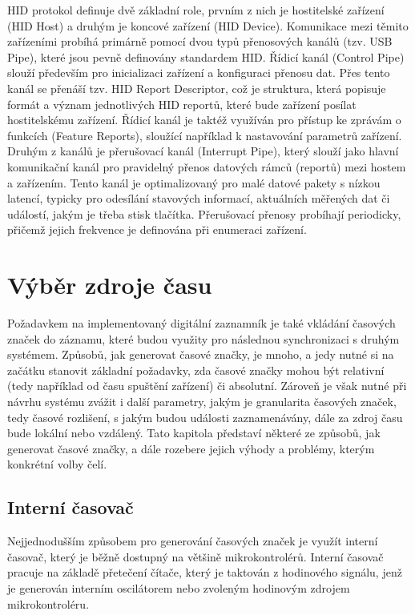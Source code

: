 HID protokol definuje dvě základní role, prvním z nich je hostitelské zařízení (HID Host) a druhým je koncové zařízení (HID Device). Komunikace mezi těmito zařízeními probíhá primárně pomocí dvou typů přenosových kanálů (tzv. USB Pipe), které jsou pevně definovány standardem HID. Řídicí kanál (Control Pipe) slouží především pro inicializaci zařízení a konfiguraci přenosu dat. Přes tento kanál se přenáší tzv. HID Report Descriptor, což je struktura, která popisuje formát a význam jednotlivých HID reportů, které bude zařízení posílat hostitelskému zařízení. Řídicí kanál je taktéž využíván pro přístup ke zprávám o funkcích (Feature Reports), sloužící například k nastavování parametrů zařízení. Druhým z kanálů je přerušovací kanál (Interrupt Pipe), který slouží jako hlavní komunikační kanál pro pravidelný přenos datových rámců (reportů) mezi hostem a zařízením. Tento kanál je optimalizovaný pro malé datové pakety s nízkou latencí, typicky pro odesílání stavových informací, aktuálních měřených dat či událostí, jakým je třeba stisk tlačítka. Přerušovací přenosy probíhají periodicky, přičemž jejich frekvence je definována při enumeraci zařízení. \cite{usb_standard_hid, silicon_labs_human_interface_device}

\section{Výběr zdroje času}
Požadavkem na implementovaný digitální zaznamník  je také vkládání časových značek do záznamu, které budou využity pro následnou synchronizaci s druhým systémem. Způsobů, jak generovat časové značky, je mnoho, a jedy nutné si na začátku stanovit základní požadavky, zda časové značky mohou být relativní (tedy například od času spuštění zařízení) či absolutní. Zároveň je však nutné při návrhu systému zvážit i další parametry, jakým je granularita časových značek, tedy časové rozlišení, s jakým budou události zaznamenávány, dále za zdroj času bude lokální nebo vzdálený. Tato kapitola představí některé ze způsobů, jak generovat časové značky, a dále rozebere jejich výhody a problémy, kterým konkrétní volby čelí. 

\subsection{Interní časovač}
Nejjednodušším způsobem pro generování časových značek je využít interní časovač, který je běžně dostupný na většině mikrokontrolérů. Interní časovač pracuje na základě přetečení čítače, který je taktován z hodinového signálu, jenž je generován interním oscilátorem nebo zvoleným hodinovým zdrojem mikrokontroléru. 

